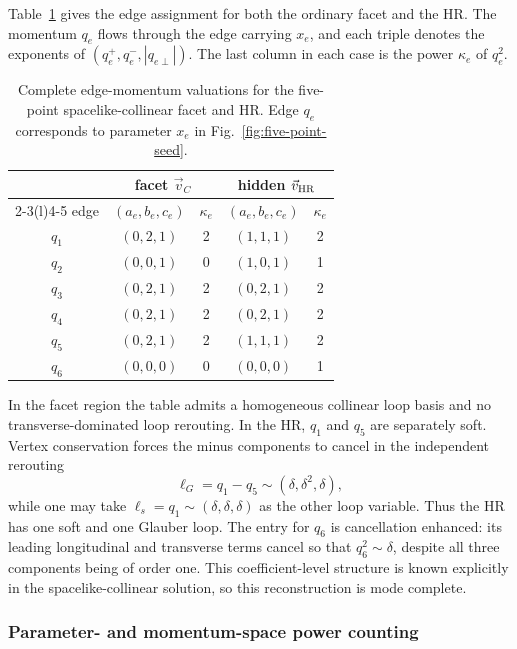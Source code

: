 \documentclass[a4paper,11pt]{article}
\newcommand{\vHR}{\vec v_{\rm HR}}
\begin{document}
Table~\ref{tab:five-sc-edge-flow} gives the edge assignment for both the
ordinary facet and the HR.  The momentum \(q_e\) flows through the edge
carrying \(x_e\), and each triple denotes the exponents of
\((q_e^+,q_e^-,|q_{e\perp}|)\).  The last column in each case is the power
\(\kappa_e\) of \(q_e^2\).
\begin{table}[htbp]
\centering
\small
\begin{tabular}{@{}c cc cc@{}}
\toprule
& \multicolumn{2}{c}{facet \(\vec v_C\)}
& \multicolumn{2}{c}{hidden \(\vHR\)}\\
\cmidrule(lr){2-3}\cmidrule(l){4-5}
edge & \((a_e,b_e,c_e)\) & \(\kappa_e\)
     & \((a_e,b_e,c_e)\) & \(\kappa_e\)\\
\midrule
\(q_1\) & \((0,2,1)\) & 2 & \((1,1,1)\) & 2\\
\(q_2\) & \((0,0,1)\) & 0 & \((1,0,1)\) & 1\\
\(q_3\) & \((0,2,1)\) & 2 & \((0,2,1)\) & 2\\
\(q_4\) & \((0,2,1)\) & 2 & \((0,2,1)\) & 2\\
\(q_5\) & \((0,2,1)\) & 2 & \((1,1,1)\) & 2\\
\(q_6\) & \((0,0,0)\) & 0 & \((0,0,0)\) & 1\\
\bottomrule
\end{tabular}
\caption{Complete edge-momentum valuations for the five-point
spacelike-collinear facet and HR.  Edge \(q_e\) corresponds to parameter
\(x_e\) in Fig.~\ref{fig:five-point-seed}.}
\label{tab:five-sc-edge-flow}
\end{table}

In the facet region the table admits a homogeneous collinear loop basis and
no transverse-dominated loop rerouting.  In the HR, \(q_1\) and \(q_5\) are
separately soft.  Vertex conservation forces the minus components to cancel
in the independent rerouting
\begin{equation}
 \ell_G=q_1-q_5\sim(\delta,\delta^2,\delta),
 \label{eq:five-sc-glauber-rerouting}
\end{equation}
while one may take \(\ell_s=q_1\sim(\delta,\delta,\delta)\) as the other
loop variable.  Thus the HR has one soft and one Glauber loop.  The entry for
\(q_6\) is cancellation enhanced: its leading longitudinal and transverse
terms cancel so that \(q_6^2\sim\delta\), despite all three components being
of order one.  This coefficient-level structure is known explicitly in the
spacelike-collinear solution, so this reconstruction is mode complete.

\subsubsection*{Parameter- and momentum-space power counting}
\end{document}

